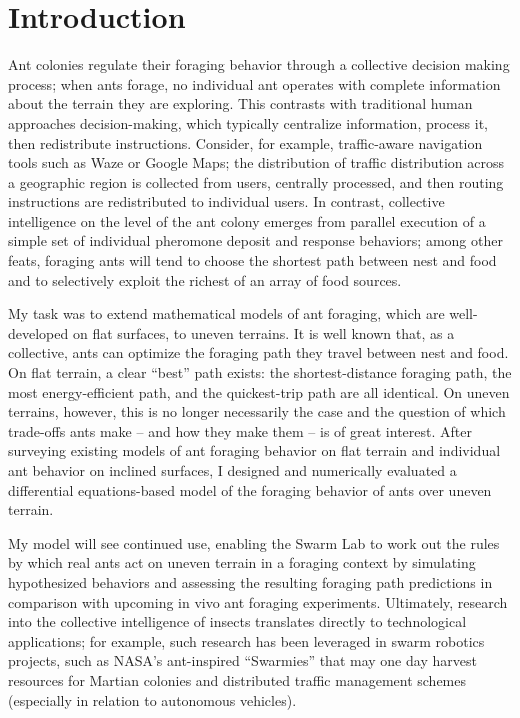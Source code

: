 \section{Introduction}

Ant colonies regulate their foraging behavior through a collective decision making process; when ants forage, no individual ant operates with complete information about the terrain they are exploring. This contrasts with traditional human approaches decision-making, which typically centralize information, process it, then redistribute instructions. Consider, for example, traffic-aware navigation tools such as Waze or Google Maps; the distribution of traffic distribution across a geographic region is collected from users, centrally processed, and then routing instructions are redistributed to individual users. In contrast, collective intelligence on the level of the ant colony emerges from parallel execution of a simple set of individual pheromone deposit and response behaviors; among other feats, foraging ants will tend to choose the shortest path between nest and food and to selectively exploit the richest of an array of food sources.

My task was to extend mathematical models of ant foraging, which are well-developed on flat surfaces, to uneven terrains. It is well known that, as a collective, ants can optimize the foraging path they travel between nest and food. On flat terrain, a clear ``best'' path exists: the shortest-distance foraging path, the most energy-efficient path, and the quickest-trip path are all identical. On uneven terrains, however, this is no longer necessarily the case and the question of which trade-offs ants make -- and how they make them -- is of great interest. After surveying existing models of ant foraging behavior on flat terrain and individual ant behavior on inclined surfaces, I designed and numerically evaluated a differential equations-based model of the foraging behavior of ants over uneven terrain.

My model will see continued use, enabling the Swarm Lab to work out the rules by which real ants act on uneven terrain in a foraging context by simulating hypothesized behaviors and assessing the resulting foraging path predictions in comparison with upcoming in vivo ant foraging experiments. Ultimately, research into the collective intelligence of insects translates directly to technological applications; for example, such research has been leveraged in swarm robotics projects, such as NASA's ant-inspired ``Swarmies'' that may one day harvest resources for Martian colonies and distributed traffic management schemes (especially in relation to autonomous vehicles).